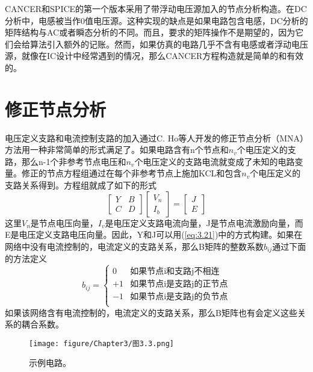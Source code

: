 CANCER\cite{ref-2}和SPICE的第一个版本采用了带浮动电压源加入的节点分析构造。在DC分析中，电感被当作0值电压源。这种实现的缺点是如果电路包含电感，DC分析的矩阵结构与AC或者瞬态分析的不同。而且，要求的矩阵操作不是期望的，因为它们会给算法引入额外的记账。然而，如果仿真的电路几乎不含有电感或者浮动电压源，就像在IC设计中经常遇到的情况，那么CANCER方程构造就是简单的和有效的。

\section{修正节点分析}
电压定义支路和电流控制支路的加入通过C. Ho等人\cite{ref-47}开发的修正节点分析（MNA）方法用一种非常简单的形式满足了。如果电路含有n个节点和$n_v$个电压定义的支路，那么n-1个非参考节点电压和$n_v$个电压定义的支路电流就变成了未知的电路变量。修正的节点方程组通过在每个非参考节点上施加KCL和包含$n_v$个电压定义的支路关系得到。方程组就成了如下的形式
\begin{equation}
    \begin{bmatrix}
    Y & B\\
    C & D
    \end{bmatrix}\begin{bmatrix}
    V_n \\
    I_b
    \end{bmatrix}=\begin{bmatrix}
    J \\
    E
    \end{bmatrix}
    \label{eq:3.28}
\end{equation}
这里$V_n$是节点电压向量，$I_v$是电压定义支路电流向量，J是节点电流激励向量，而E是电压定义支路电压向量。因此，Y和J可以用(\ref{eq:3.21})中的方式构建。如果在网络中没有电流控制的，电流定义的支路关系，那么B矩阵的整数系数$b_{ij}$通过下面的方法定义
\begin{equation*}
 b_{ij}=\left\{\begin{matrix}
0 & \text{如果节点i和支路j不相连} \\
+1 & \text{如果节点i是支路j的正节点} \\
-1 & \text{如果节点i是支路j的负节点} \\
\end{matrix}\right.   
\end{equation*}
如果该网络含有电流控制的，电流定义的支路关系，那么B矩阵也有会定义这些关系的耦合系数。

\begin{figure}[htbp]
\small
    \centering
    \texttt{[image: figure/Chapter3/图3.3.png]}
    \caption{示例电路。}
    \label{图3.3}
\end{figure}

